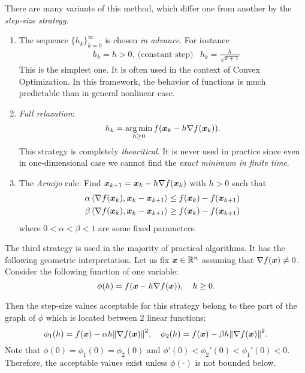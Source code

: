 There are many variants of this method, which differ one from another by the \emph{step-size strategy}.
\begin{enumerate}
    \item The sequence \(\{h_k\}_{k=0}^\infty\) is chosen \emph{in advance}. For instance
        \[
            \begin{aligned}
                &h_k = h > 0,~\text{(constant step)}
                &h_k = \frac{h}{\sqrt{k+1}}
            \end{aligned}  
        \]
        This is the simplest one. It is often used in the context of Convex Optimization. In this framework, the behavior of functions
        is much predictable than in general nonlinear case.
    \item \emph{Full relaxation}:
        \[
            h_k = \mathop{\arg\min}_{h \ge 0} f(\bm{x}_k - h \nabla f(\bm{x}_k)).  
        \]
        This strategy is completely \emph{theoritical}. It is never used in practice since even in one-dimensional case we cannot
        find the \emph{exact minimum in finite time}.
    \item The \emph{Armijo} rule: Find \(\bm{x}_{k+1} =\bm{x}_k - h\nabla f(\bm{x}_k)\) with \(h > 0\) such that
        \[
            \begin{aligned}
                \alpha \left\langle \nabla f(\bm{x}_k), \bm{x}_k - \bm{x}_{k+1} \right\rangle &\le f(\bm{x}_k) - f(\bm{x}_{k+1})\\
                \beta \left\langle \nabla f(\bm{x}_k), \bm{x}_k - \bm{x}_{k+1} \right\rangle &\ge f(\bm{x}_k) - f(\bm{x}_{k+1})
            \end{aligned}  
        \]
        where \(0 < \alpha < \beta < 1\) are some fixed parameters.
\end{enumerate}

The third strategy is used in the majority of practical algorithms. It has the following geometric interpretation.
Let us fix \(\bm{x} \in \mathbb{R}^n\) assuming that \(\nabla f(\bm{x}) \ne 0\). Consider the following function of one variable:
\[
    \phi(h) = f(\bm{x} - h \nabla f(\bm{x})), \quad h \ge 0.  
\]

Then the step-size values acceptable for this strategy belong to thee part of the graph of \(\phi\) which is located between \(2\) linear functions:
\[
    \phi_1(h) = f(\bm{x}) - \alpha h \norm{\nabla f(\bm{x})}^2, \quad \phi_2(h) = f(\bm{x}) - \beta h \norm{\nabla f(\bm{x})}^2.  
\]
Note that \(\phi(0) = \phi_1(0) = \phi_2(0)\) and \(\phi'(0) < \phi_2'(0) < \phi_1'(0) < 0\). Therefore, the acceptable values exist unless \(\phi(\cdot)\)
is not bounded below.

